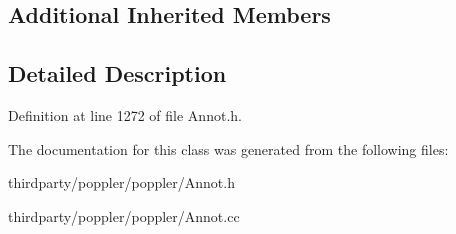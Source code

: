 \subsection*{Additional Inherited Members}


\subsection{Detailed Description}


Definition at line 1272 of file Annot.\+h.



The documentation for this class was generated from the following files\+:\begin{DoxyCompactItemize}
\item 
thirdparty/poppler/poppler/Annot.\+h\item 
thirdparty/poppler/poppler/Annot.\+cc\end{DoxyCompactItemize}
